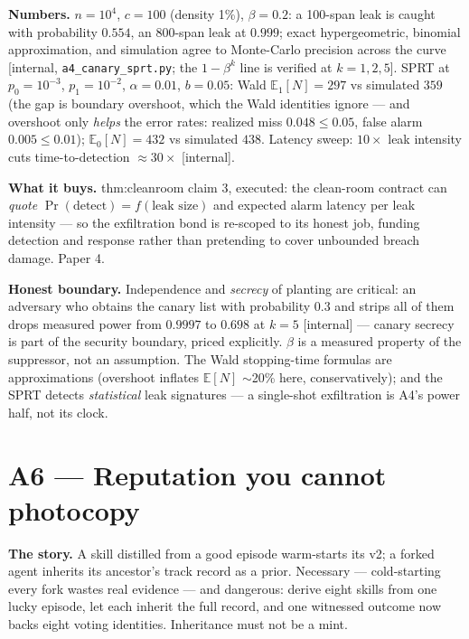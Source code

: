 \documentclass[11pt,a4paper]{article}
\begin{document}
\textbf{Numbers.} $n{=}10^4$, $c{=}100$ (density 1\%), $\beta{=}0.2$: a 100-span leak is caught with probability $0.554$, an 800-span leak at $0.999$; exact hypergeometric, binomial approximation, and simulation agree to Monte-Carlo precision across the curve [internal, \texttt{a4\_canary\_sprt.py}; the $1-\beta^k$ line is verified at $k{=}1,2,5$]. SPRT at $p_0{=}10^{-3}$, $p_1{=}10^{-2}$, $\alpha{=}0.01$, $b{=}0.05$: Wald $\mathbb{E}_1[N]=297$ vs simulated $359$ (the gap is boundary overshoot, which the Wald identities ignore --- and overshoot only \emph{helps} the error rates: realized miss $0.048\le0.05$, false alarm $0.005\le0.01$); $\mathbb{E}_0[N]=432$ vs simulated $438$. Latency sweep: $10\times$ leak intensity cuts time-to-detection $\approx30\times$ [internal].

\textbf{What it buys.} thm:cleanroom claim 3, executed: the clean-room contract can \emph{quote} $\Pr(\text{detect})=f(\text{leak size})$ and expected alarm latency per leak intensity --- so the exfiltration bond is re-scoped to its honest job, funding detection and response rather than pretending to cover unbounded breach damage. Paper 4.

\begin{boundary}
\textbf{Honest boundary.} Independence and \emph{secrecy} of planting are critical: an adversary who obtains the canary list with probability $0.3$ and strips all of them drops measured power from $0.9997$ to $0.698$ at $k{=}5$ [internal] --- canary secrecy is part of the security boundary, priced explicitly. $\beta$ is a measured property of the suppressor, not an assumption. The Wald stopping-time formulas are approximations (overshoot inflates $\mathbb{E}[N]$ $\sim$20\% here, conservatively); and the SPRT detects \emph{statistical} leak signatures --- a single-shot exfiltration is A4's power half, not its clock.
\end{boundary}

\section{A6 --- Reputation you cannot photocopy}\label{sec:a6}
\textbf{The story.} A skill distilled from a good episode warm-starts its v2; a forked agent inherits its ancestor's track record as a prior. Necessary --- cold-starting every fork wastes real evidence --- and dangerous: derive eight skills from one lucky episode, let each inherit the full record, and one witnessed outcome now backs eight voting identities. Inheritance must not be a mint.
\end{document}
